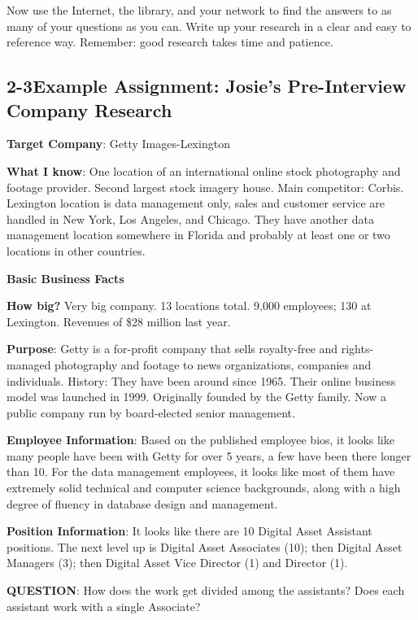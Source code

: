 Now use the Internet, the library, and your network to find the answers to as many of your questions as you can. Write up your research in a clear and easy to reference way. Remember: good research takes time and patience.
\pagebreak \subsection*{2-3\quad Example Assignment: Josie's Pre-Interview Company Research}

\textbf{Target Company}: Getty Images-Lexington

\textbf{What I know}: One location of an international online stock photography and footage provider. Second largest stock imagery house. Main competitor: Corbis. Lexington location is data management only, sales and customer service are handled in New York, Los Angeles, and Chicago. They have another data management location somewhere in Florida and probably at least one or two locations in other countries.

\textbf{Basic Business Facts}

\textbf{How big?} Very big company. 13 locations total. 9,000 employees; 130 at Lexington. Revenues of \$28 million last year.

\textbf{Purpose}: Getty is a for-profit company that sells royalty-free and rights-managed photography and footage to news organizations, companies and individuals.
History: They have been around since 1965. Their online business model was launched in 1999. Originally founded by the Getty family. Now a public company run by board-elected senior management.

\textbf{Employee Information}: Based on the published employee bios, it looks like many people have been with Getty for over 5 years, a few have been there longer than 10.
For the data management employees, it looks like most of them have extremely solid technical and computer science backgrounds, along with a high degree of fluency in database design and management.

\textbf{Position Information}: It looks like there are 10 Digital Asset Assistant positions. The next level up is Digital Asset Associates (10); then Digital Asset Managers (3); then Digital Asset Vice Director (1) and Director (1).

\textbf{QUESTION}: How does the work get divided among the assistants? Does each assistant work with a single Associate?

